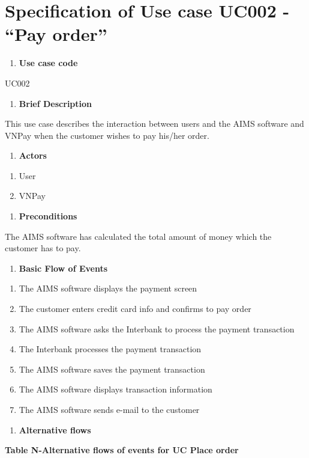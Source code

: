 \documentclass[letterpaper]{report}
\begin{document}
\bigskip


\bigskip

\section[Specification of Use case UC002 {}- “Pay order”]{Specification of Use case UC002 - “Pay order”}
\begin{enumerate}
\item \textbf{Use case code}
\end{enumerate}
UC002

\begin{enumerate}
\item \textbf{Brief Description}
\end{enumerate}
This use case describes the interaction between users and the AIMS software and VNPay when the customer wishes to pay his/her order.

\begin{enumerate}
\item \textbf{Actors}
\end{enumerate}
\begin{enumerate}
\item User
\item VNPay
\end{enumerate}
\begin{enumerate}
\item \textbf{Preconditions}
\end{enumerate}
The AIMS software has calculated the total amount of money which the customer has to pay.

\begin{enumerate}
\item \textbf{Basic Flow of Events}
\end{enumerate}
\begin{enumerate}
\item The AIMS software displays the payment screen
\item The customer enters credit card info and confirms to pay order
\item The AIMS software asks the Interbank to process the payment transaction
\item The Interbank processes the payment transaction
\item The AIMS software saves the payment transaction
\item The AIMS software displays transaction information
\item The AIMS software sends e-mail to the customer
\end{enumerate}
\begin{enumerate}
\item \textbf{Alternative flows}
\end{enumerate}
{\bfseries
Table N-Alternative flows of events for UC Place order}
\end{document}
